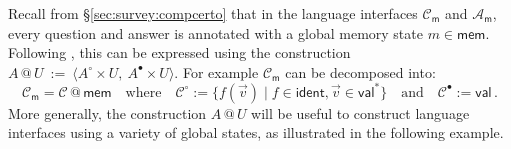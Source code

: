 \documentclass[acmsmall,screen,review,anonymous]{acmart}
\newcommand{\kw}[1]{\ensuremath{ \mathsf{#1} }}
\newcommand{\que}{\circ}
\newcommand{\ans}{\bullet}
\begin{document}

Recall from \S\ref{sec:survey:compcerto}
that in the language interfaces $\mathcal{C}_\kw{m}$ and $\mathcal{A}_\kw{m}$,
every question and answer is annotated with a global memory state $m \in \kw{mem}$.
Following \citet{rbgs-cal},
this can be expressed using the construction
$
  A \mathbin@ U \: := \:
    \langle A^\que \times U, \: A^\ans \times U \rangle
$.
For example
$\mathcal{C}_\kw{m}$ can be decomposed into:
\[
  \mathcal{C}_\kw{m} = \mathcal{C} \mathbin@ \kw{mem}
  \quad \text{where} \quad
  \mathcal{C}^\que := \{ f(\vec{v}) \mid f \in \kw{ident}, \vec{v} \in \kw{val}^* \}
  \quad \text{and} \quad
  \mathcal{C}^\ans := \kw{val}
  \,.
\]
More generally,
the construction $A \mathbin@ U$
will be useful to construct
language interfaces using a variety of global states,
as illustrated in the following example.
\end{document}
